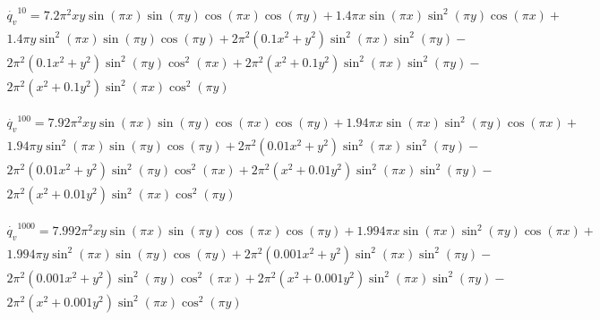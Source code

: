 \begin{multline}
\dot{q_v}^{10}=7.2 \pi^{2} x y \sin{\left(\pi x \right)} \sin{\left(\pi y \right)} \cos{\left(\pi x \right)} \cos{\left(\pi y \right)} + 1.4 \pi x \sin{\left(\pi x \right)} \sin^{2}{\left(\pi y \right)} \cos{\left(\pi x \right)} +\\ 1.4 \pi y \sin^{2}{\left(\pi x \right)} \sin{\left(\pi y \right)} \cos{\left(\pi y \right)} + 2 \pi^{2} \left(0.1 x^{2} + y^{2}\right) \sin^{2}{\left(\pi x \right)} \sin^{2}{\left(\pi y \right)} -\\ 2 \pi^{2} \left(0.1 x^{2} + y^{2}\right) \sin^{2}{\left(\pi y \right)} \cos^{2}{\left(\pi x \right)} + 2 \pi^{2} \left(x^{2} + 0.1 y^{2}\right) \sin^{2}{\left(\pi x \right)} \sin^{2}{\left(\pi y \right)} -\\ 2 \pi^{2} \left(x^{2} + 0.1 y^{2}\right) \sin^{2}{\left(\pi x \right)} \cos^{2}{\left(\pi y \right)} \quad \quad \quad \quad
\end{multline}

\begin{multline}
\dot{q_v}^{100}=7.92 \pi^{2} x y \sin{\left(\pi x \right)} \sin{\left(\pi y \right)} \cos{\left(\pi x \right)} \cos{\left(\pi y \right)} + 1.94 \pi x \sin{\left(\pi x \right)} \sin^{2}{\left(\pi y \right)} \cos{\left(\pi x \right)} +\\ 1.94 \pi y \sin^{2}{\left(\pi x \right)} \sin{\left(\pi y \right)} \cos{\left(\pi y \right)} + 2 \pi^{2} \left(0.01 x^{2} + y^{2}\right) \sin^{2}{\left(\pi x \right)} \sin^{2}{\left(\pi y \right)} -\\ 2 \pi^{2} \left(0.01 x^{2} + y^{2}\right) \sin^{2}{\left(\pi y \right)} \cos^{2}{\left(\pi x \right)} + 2 \pi^{2} \left(x^{2} + 0.01 y^{2}\right) \sin^{2}{\left(\pi x \right)} \sin^{2}{\left(\pi y \right)} -\\ 2 \pi^{2} \left(x^{2} + 0.01 y^{2}\right) \sin^{2}{\left(\pi x \right)} \cos^{2}{\left(\pi y \right)} \quad \quad \quad \quad
\end{multline}

\begin{multline}
\dot{q_v}^{1000}=7.992 \pi^{2} x y \sin{\left(\pi x \right)} \sin{\left(\pi y \right)} \cos{\left(\pi x \right)} \cos{\left(\pi y \right)} + 1.994 \pi x \sin{\left(\pi x \right)} \sin^{2}{\left(\pi y \right)} \cos{\left(\pi x \right)} +\\ 1.994 \pi y \sin^{2}{\left(\pi x \right)} \sin{\left(\pi y \right)} \cos{\left(\pi y \right)} + 2 \pi^{2} \left(0.001 x^{2} + y^{2}\right) \sin^{2}{\left(\pi x \right)} \sin^{2}{\left(\pi y \right)} -\\ 2 \pi^{2} \left(0.001 x^{2} + y^{2}\right) \sin^{2}{\left(\pi y \right)} \cos^{2}{\left(\pi x \right)} + 2 \pi^{2} \left(x^{2} + 0.001 y^{2}\right) \sin^{2}{\left(\pi x \right)} \sin^{2}{\left(\pi y \right)} -\\ 2 \pi^{2} \left(x^{2} + 0.001 y^{2}\right) \sin^{2}{\left(\pi x \right)} \cos^{2}{\left(\pi y \right)} \quad \quad \quad \quad
\end{multline}

